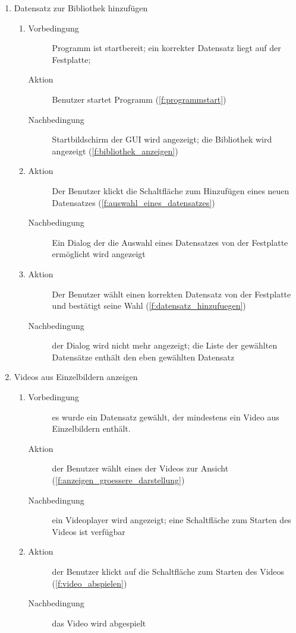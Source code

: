 \begin{enumerate} [label=\bfseries /TS \arabic*0/, leftmargin=*]
	\item Datensatz zur Bibliothek hinzufügen
	\begin{enumerate}
		\item
		\begin{description}
			\item[Vorbedingung] Programm ist startbereit; ein korrekter Datensatz liegt auf der Festplatte; %
			\item[Aktion] Benutzer startet Programm (\ref{f:programmstart})
			\item[Nachbedingung] Startbildschirm der GUI wird angezeigt; die Bibliothek wird angezeigt (\ref{f:bibliothek_anzeigen})
		\end{description}
		\item
		\begin{description}
			\item[Aktion] Der Benutzer klickt die Schaltfläche zum Hinzufügen eines neuen Datensatzes (\ref{f:auswahl_eines_datensatzes})
			\item[Nachbedingung] Ein \gls{Dialog} der die Auswahl eines Datensatzes von der Festplatte ermöglicht wird angezeigt
		\end{description}
		\item
		\begin{description}
			\item[Aktion] Der Benutzer wählt einen korrekten Datensatz von der Festplatte und bestätigt seine Wahl (\ref{f:datensatz_hinzufuegen})
			\item[Nachbedingung] der \gls{Dialog} wird nicht mehr angezeigt; die Liste der gewählten Datensätze enthält den eben gewählten Datensatz
		\end{description}
	\end{enumerate}

	\item Videos aus Einzelbildern anzeigen
	\begin{enumerate}
		\item
		\begin{description}
			\item[Vorbedingung] es wurde ein Datensatz gewählt, der mindestens ein Video aus Einzelbildern enthält.
			\item[Aktion] der Benutzer wählt eines der Videos zur Ansicht (\ref{f:anzeigen_groessere_darstellung})
			\item[Nachbedingung] ein Videoplayer wird angezeigt; eine Schaltfläche zum Starten des Videos ist verfügbar
		\end{description}
		\item
		\begin{description}
			\item[Aktion] der Benutzer klickt auf die Schaltfläche zum Starten des Videos (\ref{f:video_abspielen})
			\item[Nachbedingung] das Video wird abgespielt
		\end{description}
	\end{enumerate}


\end{enumerate}
